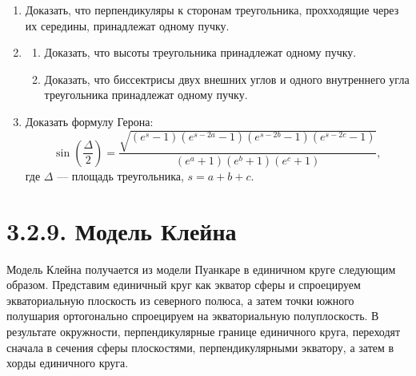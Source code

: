 	\begin{enumerate}[resume*]
		\item Доказать, что перпендикуляры к сторонам треугольника, прохходящие через их середины, принадлежат одному пучку.
 
		\item
		\begin{enumerate}
			\item Доказать, что высоты треугольника принадлежат одному пучку.
			\item Доказать, что биссектрисы двух внешних углов и одного внутреннего угла треугольника принадлежат одному пучку.
		\end{enumerate}
 
		\item Доказать формулу Герона:
		\[
			\sin\left(\frac{\Delta}{2}\right) = \frac{\sqrt{(e^s - 1)(e^{s-2a} - 1)(e^{s-2b} - 1)(e^{s-2c} - 1)}}{(e^{a} + 1)(e^{b} + 1)(e^{c} + 1)},
		\]
		где $\Delta$ --- площадь треугольника, $s = a + b + c$.
	\end{enumerate}
 
	\section{3.2.9. Модель Клейна}
 
	Модель Клейна получается из модели Пуанкаре в единичном круге следующим образом. Представим единичный круг как экватор сферы и спроецируем экваториальную плоскость из северного полюса, а затем точки южного полушария ортогонально спроецируем на экваториальную полуплоскость. В результате окружности, перпендикулярные границе единичного круга, переходят сначала в сечения сферы плоскостями, перпендикулярными экватору, а затем в хорды единичного круга.
 	
